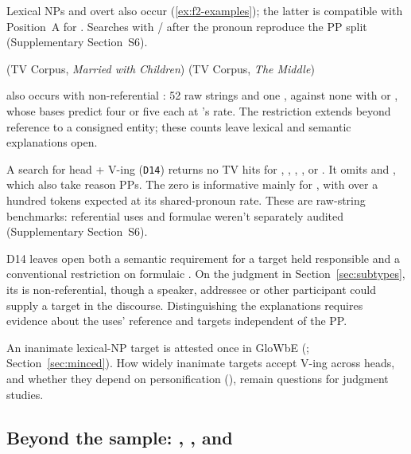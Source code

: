 \documentclass[12pt]{article}
\begin{document}
Lexical NPs and overt  also occur (\ref{ex:f2-examples}); the latter is compatible with Position~A for . Searches with / after the pronoun reproduce the PP split (Supplementary Section~S6).

\ea\label{ex:f2-examples}
\ea {} \hfill (TV Corpus, \emph{Married with Children})
\ex {} \hfill (TV Corpus, \emph{The Middle})
\z
\z

 also occurs with non-referential : 52 raw  strings and one , against none with  or , whose bases predict four or five each at 's rate. The restriction extends beyond reference to a consigned entity; these counts leave lexical and semantic explanations open.

A search for head +  V-ing (\texttt{D14}) returns no TV hits for , , , ,  or . It omits  and , which also take reason PPs. The zero is informative mainly for , with over a hundred tokens expected at its shared-pronoun rate. These are raw-string benchmarks: referential uses and formulae weren't separately audited (Supplementary Section~S6).

D14 leaves open both a semantic requirement for a target held responsible and a conventional restriction on formulaic . On the judgment in Section~\ref{sec:subtypes}, its  is non-referential, though a speaker, addressee or other participant could supply a target in the discourse. Distinguishing the explanations requires evidence about the uses' reference and targets independent of the PP.

An inanimate lexical-NP target is attested once in GloWbE (; Section~\ref{sec:minced}). How widely inanimate targets accept  V-ing across heads, and whether they depend on personification (), remain questions for judgment studies.

\subsection{Beyond the sample: , ,  and }
\label{sec:beyond}
\end{document}
